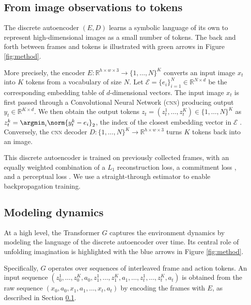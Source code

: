 \subsection{From image observations to tokens}
\label{section:im_to_tok}

The discrete autoencoder $(E, D)$ learns a symbolic language of its own to represent high-dimensional images as a small number of tokens. The back and forth between frames and tokens is illustrated with green arrows in Figure \ref{fig:method}.

More precisely, the encoder $E : \mathbb{R}^{h \times w \times 3} \rightarrow \{ 1, \dots, N \}^K$ converts an input image $x_t$ into $K$ tokens from a vocabulary of size $N$. Let $\mathcal{E} = \{e_i\}_{i=1}^N \in \mathbb{R}^{N \times d}$ be the corresponding embedding table of $d$-dimensional vectors. The input image $x_t$ is first passed through a Convolutional Neural Network (\textsc{cnn}) \citep{cnn_lecun} producing output $y_t \in \mathbb{R}^{K \times d}$. We then obtain the output tokens $z_t = (z_t^1, \dots, z_t^K) \in \{ 1, \dots, N \}^K$ as $z_t^k = \argmin_{i} \norm{y_t^k - e_i}_2$, the index of the closest embedding vector in $\mathcal{E}$ \citep{vqvae, vqgan}. Conversely, the \textsc{cnn} decoder $D : \{1, \dots, N\}^K \rightarrow \mathbb{R}^{h \times w \times 3}$ turns $K$ tokens back into an image. 

This discrete autoencoder is trained on previously collected frames, with an equally weighted combination of a $L_1$ reconstruction loss, a commitment loss \citep{vqvae, vqgan}, and a perceptual loss \citep{vqgan, johnson, larsen}. We use a straight-through estimator \citep{straightthrough} to enable backpropagation training. 


\subsection{Modeling dynamics}
\label{section:modeling_dynamics}

At a high level, the Transformer $G$ captures the environment dynamics by modeling the language of the discrete autoencoder over time. Its central role of unfolding imagination is highlighted with the blue arrows in Figure \ref{fig:method}. 

Specifically, $G$ operates over sequences of interleaved frame and action tokens. An input sequence $(z_0^1, \dots, z_0^K, a_0, z_1^1, \dots, z_1^K, a_1, \dots, z_t^1, \dots, z_t^K, a_t)$ is obtained from the raw sequence $(x_0, a_0, x_1, a_1, \dots, x_t, a_t)$ by encoding the frames with $E$, as described in Section \ref{section:im_to_tok}.

